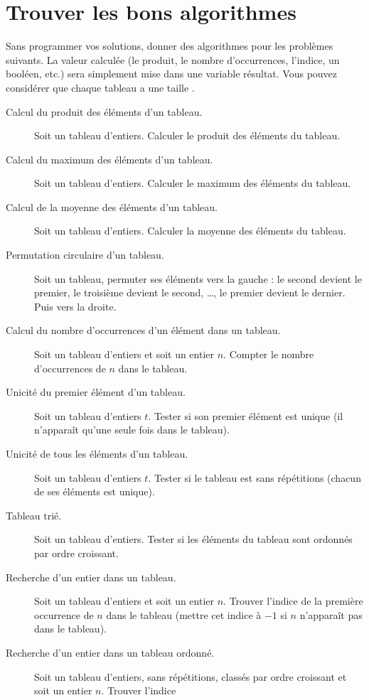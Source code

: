 \section{Trouver les bons algorithmes}
Sans programmer vos solutions, donner des algorithmes pour les
problèmes suivants. La valeur calculée (le produit, le nombre
d'occurrences, l'indice, un booléen, etc.)  sera simplement mise dans une
variable résultat. Vous pouvez considérer que chaque tableau  a
une taille .
\begin{description}
\item[Calcul du produit des éléments d'un tableau.] Soit un tableau
  d'entiers. Calculer le produit des éléments du tableau.
\item[Calcul du maximum des éléments d'un tableau.] Soit un tableau
  d'entiers. Calculer le maximum des éléments du tableau.
\item[Calcul de la moyenne des éléments d'un tableau.] Soit un tableau
  d'entiers. Calculer la moyenne des éléments du tableau.
\item[Permutation circulaire d'un tableau.] Soit un tableau, permuter
  ses éléments vers la gauche : le second devient le premier, le
  troisième devient le second, \ldots, le premier devient le dernier.
  Puis vers la droite.
\item[Calcul du nombre d'occurrences d'un élément dans un tableau.] Soit
  un tableau d'entiers et soit un entier $n$. Compter le
  nombre d'occurrences de $n$ dans le tableau.
\item[Unicité du premier élément d'un tableau.] Soit
  un tableau d'entiers $t$. Tester si son premier élément est unique
  (il n'apparaît qu'une seule fois dans le tableau).
\item[Unicité de tous les éléments d'un tableau.] Soit
  un tableau d'entiers $t$. Tester si le tableau est sans
  répétitions (chacun de ses éléments est unique).
\item[Tableau trié.]  Soit un tableau d'entiers. Tester si les
  éléments du tableau sont ordonnés par ordre croissant.
\item[Recherche d'un entier dans un tableau.] Soit
  un tableau d'entiers et soit un entier $n$.  Trouver l'indice
  de la première occurrence  de $n$ dans le tableau (mettre cet
  indice à $-1$ si $n$ n'apparaît pas dans le tableau).
\item[Recherche d'un entier dans un tableau ordonné.] Soit
  un tableau d'entiers, sans répétitions, classés par ordre croissant
  et soit un entier $n$.  Trouver l'indice

\end{description}
